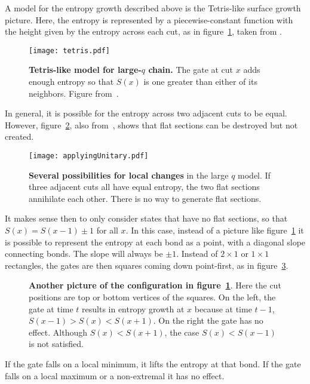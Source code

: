 A model for the entropy growth described above is the Tetris-like surface growth picture. Here, the entropy is represented by a piecewise-constant function with the height given by the entropy across each cut, as in figure~\ref{fig:tetris}, taken from \cite{Nahum2017}. 
\begin{figure}
	\centering
	\texttt{[image: tetris.pdf]}
	\caption{\textbf{Tetris-like model for large-$q$ chain.} The gate at cut $x$ adds enough entropy so that $S(x)$ is one greater than either of its neighbors. Figure from~\cite{Nahum2017}.}
	\label{fig:tetris}
\end{figure}
In general, it is possible for the entropy across two adjacent cuts to be equal. However, figure~\ref{fig:applyingUnitary}, also from~\cite{Nahum2017}, shows that flat sections can be destroyed but not created. 
\begin{figure}
	\centering
	\texttt{[image: applyingUnitary.pdf]}
	\caption{\textbf{Several possibilities for local changes} in the large $q$ model. If three adjacent cuts all have equal entropy, the two flat sections annihilate each other. There is no way to generate flat sections.}
	\label{fig:applyingUnitary}
\end{figure}

It makes sense then to only consider states that have no flat sections, so that $S(x) = S(x-1)\pm1$ for all $x$. In this case, instead of a picture like figure~\ref{fig:tetris} it is possible to represent the entropy at each bond as a point, with a diagonal slope connecting bonds. The slope will always be $\pm1$. Instead of $2\times1$ or $1\times1$ rectangles, the gates are then squares coming down point-first, as in figure~\ref{fig:diaggate}. 
\begin{figure}
	\centering
	
	\caption{\textbf{Another picture of the configuration in figure~\ref{fig:tetris}}. Here the cut positions are top or bottom vertices of the squares. On the left, the gate at time $t$ results in entropy growth at $x$ because at time $t-1$, $S(x-1) > S(x) < S(x+1)$. On the right the gate has no effect. Although $S(x) < S(x+1)$, the case $S(x) < S(x-1)$ is not satisfied. }
	\label{fig:diaggate}
\end{figure}
If the gate falls on a local minimum, it lifts the entropy at that bond. If the gate falls on a local maximum or a non-extremal it has no effect.